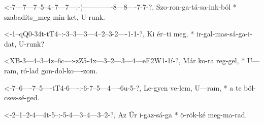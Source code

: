   {<-7---7---7--5--4--7---7---:-¦-------------8---8----7-7-?,}
  {  Szo-ron-ga-tá-sa-ink-ból * szabadíts_meg min-ket, U-runk.}

  {<-1--qQ0-34t-tT4--:-3--3---3---4--2--3-2----1-1-?,}
  {  Ki ér--ti  meg, * ir-gal-mas-sá-ga-i-dat, U-runk?}



  {<XB-3---4--3--4z--6c---:-zZ5-4x---3--2---3---4---eE2W1-1í-?,}
  {    Már ko-ra reg-gel, * U---ram, ró-lad gon-dol-ko----zom.}

  {<-7--6----7--5----tT4-6----:-6-7--5---4----6u-5-?,}
  {  Le-gyen ve-lem, U---ram, * a te böl-cses-sé-ged.}

  {<-2--1--2-4---4t-5--:-5-4---3--4---3--2-?,}
  {  Az Úr i-gaz-sá-ga * ö-rök-ké meg-ma-rad.}